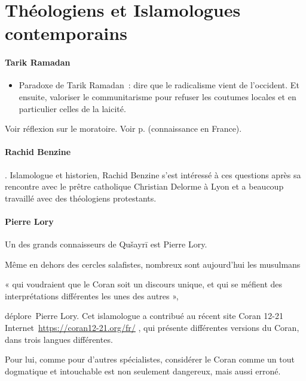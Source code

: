 \section{Théologiens et Islamologues contemporains}
\paragraph{Tarik Ramadan}
 \begin{itemize}
  \item Paradoxe de Tarik Ramadan~: dire que le radicalisme vient de
    l'occident. Et ensuite, valoriser le communitarisme pour refuser les
    coutumes locales et en particulier celles de la laicité.
  \end{itemize}
  
Voir réflexion sur le moratoire.
Voir p. \pageref{Theol:TRamadan1} (connaissance en France).


\paragraph{Rachid Benzine}.
Islamologue et historien, Rachid Benzine s’est intéressé à ces questions après sa rencontre avec le prêtre catholique Christian Delorme à Lyon et a beaucoup travaillé avec des théologiens protestants.
\paragraph{Pierre Lory}
\label{Theol:PierreLory}
Un des grands connaisseurs de Qušayrī est
Pierre Lory.

Même en dehors des cercles salafistes, nombreux sont aujourd'hui les
musulmans~

\begin{cite}
« qui voudraient que le Coran soit un discours unique,
et qui se méfient des interprétations différentes les unes des autres
»,~
\end{cite}
\emph{}déplore~{{Pierre
Lory}}. Cet islamologue a contribué au récent site {{Coran 12-21}}
Internet~\url{https://coran12-21.org/fr/} , qui
présente différentes versions du Coran, dans trois langues différentes.

Pour lui, comme pour d'autres spécialistes, considérer le Coran comme un
tout dogmatique et intouchable est non seulement dangereux, mais aussi
erroné.


